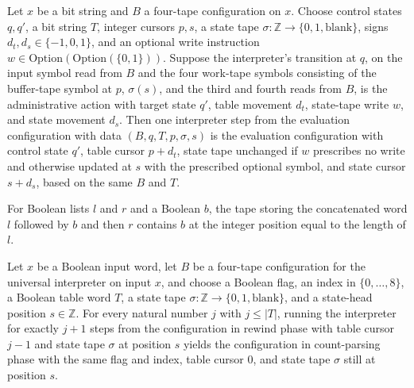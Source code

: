\begin{lemma}
\label{Turing.universalEval_step}
\leanok
{}
Let $x$ be a bit string and $B$ a four-tape configuration on $x$. Choose control states
$q,q'$, a bit string $T$, integer cursors $p,s$, a state tape
$\sigma\colon\mathbb{Z}\to\{0,1,\mathrm{blank}\}$, signs $d_t,d_s\in\{-1,0,1\}$, and an
optional write instruction $w\in\mathrm{Option}(\mathrm{Option}(\{0,1\}))$. Suppose the
interpreter's transition at $q$, on the input symbol read from $B$ and the four
work-tape symbols consisting of the buffer-tape symbol at $p$, $\sigma(s)$, and the
third and fourth reads from $B$, is the administrative action with target state $q'$,
table movement $d_t$, state-tape write $w$, and state movement $d_s$. Then one
interpreter step from the evaluation configuration with data $(B,q,T,p,\sigma,s)$ is the
evaluation configuration with control state $q'$, table cursor $p+d_t$, state tape
unchanged if $w$ prescribes no write and otherwise updated at $s$ with the prescribed
optional symbol, and state cursor $s+d_s$, based on the same $B$ and $T$.
\end{lemma}

\begin{lemma}
\label{Turing.universal_table_read}
\leanok
{}
For Boolean lists $l$ and $r$ and a Boolean $b$, the tape storing the concatenated word
$l$ followed by $b$ and then $r$ contains $b$ at the integer position equal to the
length of $l$.
\end{lemma}

\begin{lemma}
\label{Turing.universal_table_rewind}
\leanok
{}
Let $x$ be a Boolean input word, let $B$ be a four-tape configuration for the universal
interpreter on input $x$, and choose a Boolean flag, an index in $\{0,\ldots,8\}$, a
Boolean table word $T$, a state tape $\sigma\colon\mathbb Z\to\{0,1,\mathrm{blank}\}$,
and a state-head position $s\in\mathbb Z$. For every natural number $j$ with $j\le |T|$,
running the interpreter for exactly $j+1$ steps from the configuration in rewind phase
with table cursor $j-1$ and state tape $\sigma$ at position $s$ yields the configuration
in count-parsing phase with the same flag and index, table cursor $0$, and state tape
$\sigma$ still at position $s$.
\end{lemma}

